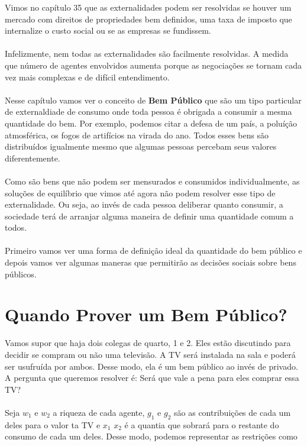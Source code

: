 \documentclass[a4paper,11pt,oneside]{book}
\theoremstyle{definition}
\theoremstyle{break}
\begin{document}
Vimos no capítulo 35 que as externalidades podem ser resolvidas se houver um mercado com direitos de propriedades bem definidos, uma taxa de imposto que internalize o custo social ou se as empresas se fundissem.
\\~\\ 
Infelizmente, nem todas as externalidades são facilmente resolvidas. A medida que número de agentes envolvidos aumenta porque as negociações se tornam cada vez mais complexas e de difícil entendimento.
\\~\\
Nesse capítulo vamos ver o conceito de \textbf{Bem Público} que são um tipo particular de externaldiade de consumo onde toda pessoa é obrigada a consumir a mesma quantidade do bem. Por exemplo, podemos citar a defesa de um país, a poluíção atmosférica, os fogos de artifícios na virada do ano. Todos esses bens são distribuídos igualmente mesmo que algumas pessoas percebam seus valores diferentemente.
\\~\\
Como são bens que não podem ser mensurados e consumidos individualmente, as soluções de equilíbrio que vimos até agora não podem resolver esse tipo de externalidade. Ou seja, ao invés de cada pessoa deliberar quanto consumir, a sociedade terá de arranjar alguma maneira de definir uma quantidade comum a todos.
\\~\\
Primeiro vamos ver uma forma de definição ideal da quantidade do bem público e depois vamos ver algumas maneras que permitirão as decisões sociais sobre bens públicos.

\section{Quando Prover um Bem Público?}

Vamos supor que haja dois colegas de quarto, 1 e 2. Eles estão discutindo para decidir se compram ou não uma televisão. A TV será instalada na sala e poderá ser usufruída por ambos. Desse modo, ela é um bem público ao invés de privado. A pergunta que queremos resolver é: Será que vale a pena para eles comprar essa TV?
\\~\\
Seja $w_1$ e $w_2$ a riqueza de cada agente, $g_1$ e $g_2$ são as contribuições de cada um deles para o valor ta TV e $x_1$ $x_2$ é a quantia que sobrará para o restante do consumo de cada um deles. Desse modo, podemos representar as restrições como
\end{document}
